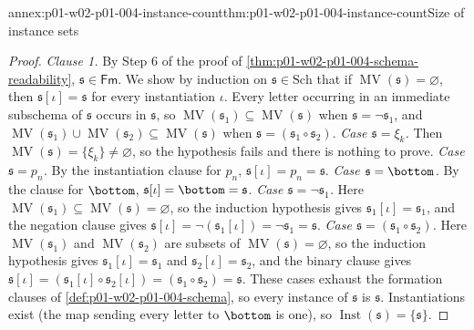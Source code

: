\begin{annexitem}{annex:p01-w02-p01-004-instance-count}{thm:p01-w02-p01-004-instance-count}{Size of instance sets}
\begin{proof}
\emph{Clause 1.} By Step 6 of the proof of
\cref{thm:p01-w02-p01-004-schema-readability}, \(\mathfrak s\in\mathsf{Fm}\).
We show by induction on \(\mathfrak s\in\mathrm{Sch}\) that if
\(\operatorname{MV}(\mathfrak s)=\varnothing\), then
\(\mathfrak s[\iota]=\mathfrak s\) for every instantiation \(\iota\). Every
letter occurring in an immediate subschema of \(\mathfrak s\) occurs in
\(\mathfrak s\), so \(\operatorname{MV}(\mathfrak s_1)\subseteq
\operatorname{MV}(\mathfrak s)\) when \(\mathfrak s=\neg\mathfrak s_1\), and
\(\operatorname{MV}(\mathfrak s_1)\cup\operatorname{MV}(\mathfrak s_2)\subseteq
\operatorname{MV}(\mathfrak s)\) when \(\mathfrak s=(\mathfrak s_1\circ
\mathfrak s_2)\).
\emph{Case \(\mathfrak s=\xi_k\).} Then \(\operatorname{MV}(\mathfrak
s)=\{\xi_k\}\ne\varnothing\), so the hypothesis fails and there is nothing to
prove.
\emph{Case \(\mathfrak s=p_n\).} By the instantiation clause for \(p_n\),
\(\mathfrak s[\iota]=p_n=\mathfrak s\).
\emph{Case \(\mathfrak s=\bottom\).} By the clause for \(\bottom\),
\(\mathfrak s[\iota]=\bottom=\mathfrak s\).
\emph{Case \(\mathfrak s=\neg\mathfrak s_1\).} Here
\(\operatorname{MV}(\mathfrak s_1)\subseteq\operatorname{MV}(\mathfrak
s)=\varnothing\), so the induction hypothesis gives \(\mathfrak
s_1[\iota]=\mathfrak s_1\), and the negation clause gives
\(\mathfrak s[\iota]=\neg(\mathfrak s_1[\iota])=\neg\mathfrak s_1=\mathfrak s\).
\emph{Case \(\mathfrak s=(\mathfrak s_1\circ\mathfrak s_2)\).} Here
\(\operatorname{MV}(\mathfrak s_1)\) and \(\operatorname{MV}(\mathfrak s_2)\)
are subsets of \(\operatorname{MV}(\mathfrak s)=\varnothing\), so the
induction hypothesis gives \(\mathfrak s_1[\iota]=\mathfrak s_1\) and
\(\mathfrak s_2[\iota]=\mathfrak s_2\), and the binary clause gives
\(\mathfrak s[\iota]=(\mathfrak s_1[\iota]\circ\mathfrak s_2[\iota])
=(\mathfrak s_1\circ\mathfrak s_2)=\mathfrak s\).
These cases exhaust the formation clauses of
\cref{def:p01-w02-p01-004-schema}, so every instance of \(\mathfrak s\) is
\(\mathfrak s\). Instantiations exist (the map sending every letter to
\(\bottom\) is one), so \(\operatorname{Inst}(\mathfrak s)=\{\mathfrak s\}\).


\end{proof}
\end{annexitem}
